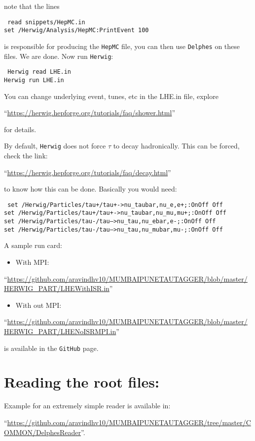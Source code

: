 note that the lines
\begin{center}
    \begin{minipage}{0.7\textwidth}
        {\tt
            read snippets/HepMC.in\\
            set /Herwig/Analysis/HepMC:PrintEvent 100
        }
    \end{minipage}
\end{center}
is responsible for producing the {\tt HepMC} file, you can then use {\tt Delphes} on these files. We are done. Now run {\tt Herwig}:
\begin{center}
    \begin{minipage}{0.7\textwidth}
        {\tt
            Herwig read LHE.in\\
            Herwig run LHE.in
        }
    \end{minipage}
\end{center}
You can change underlying event, tunes, etc in the LHE.in file, explore 
\begin{flushleft}
    ``\small{\url{https://herwig.hepforge.org/tutorials/faq/shower.html}}''
\end{flushleft}
for details.

By default, {\tt Herwig} does not force $\tau$ to decay hadronically. This can be forced, check the link: 
\begin{flushleft}
    \small{``\url{https://herwig.hepforge.org/tutorials/faq/decay.html}''}
\end{flushleft}
to know how this can be done. Basically you would need:
\begin{center}
    \begin{minipage}{0.8\textwidth}
        {\tt
            set /Herwig/Particles/tau+/tau+->nu\_taubar,nu\_e,e+;:OnOff Off\\
            set /Herwig/Particles/tau+/tau+->nu\_taubar,nu\_mu,mu+;:OnOff Off\\
            set /Herwig/Particles/tau-/tau-->nu\_tau,nu\_ebar,e-;:OnOff Off\\
            set /Herwig/Particles/tau-/tau-->nu\_tau,nu\_mubar,mu-;:OnOff Off
        }
    \end{minipage}
\end{center}

A sample run card:
\begin{itemize}
    \item With MPI:
\end{itemize}
\begin{flushleft}
    ``\small{\url{https://github.com/aravindhv10/MUMBAIPUNETAUTAGGER/blob/master/HERWIG_PART/LHEWithISR.in}}''
\end{flushleft}
\begin{itemize}
    \item With out MPI:
\end{itemize}
\begin{flushleft}
    ``\small{\url{https://github.com/aravindhv10/MUMBAIPUNETAUTAGGER/blob/master/HERWIG_PART/LHENoISRMPI.in}}''
\end{flushleft}
is available in the {\tt GitHub} page.

\section{Reading the root files:}
Example for an extremely simple reader is available in:
\begin{flushleft}
    ``\small{\url{https://github.com/aravindhv10/MUMBAIPUNETAUTAGGER/tree/master/COMMON/DelphesReader}}''.
\end{flushleft}
